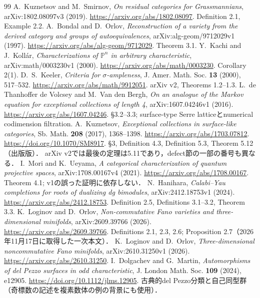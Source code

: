 \documentclass[11pt,a4paper]{ltjsarticle}
\begin{document}
\begingroup\small
\begin{thebibliography}{99}
 A.~Kuznetsov and M.~Smirnov,
\emph{On residual categories for Grassmannians}, arXiv:1802.08097v3 (2019).
\url{https://arxiv.org/abs/1802.08097}. Definition 2.1, Example 2.2.
 A.~Bondal and D.~Orlov,
\emph{Reconstruction of a variety from the derived category and groups of autoequivalences},
arXiv:alg-geom/9712029v1 (1997).
\url{https://arxiv.org/abs/alg-geom/9712029}. Theorem 3.1.
 Y.~Kachi and J.~Koll\'ar,
\emph{Characterizations of $\mathbb P^n$ in arbitrary characteristic},
arXiv:math/0003230v1 (2000).
\url{https://arxiv.org/abs/math/0003230}. Corollary 2(1).
 D.~S.~Keeler,
\emph{Criteria for $\sigma$-ampleness}, J. Amer. Math. Soc. \textbf{13} (2000), 517--532.
\url{https://arxiv.org/abs/math/9912051}. arXiv v2, Theorems 1.2--1.3.
 L.~de Thanhoffer de Volcsey and M.~Van den Bergh,
\emph{On an analogue of the Markov equation for exceptional collections of length 4},
arXiv:1607.04246v1 (2016). \url{https://arxiv.org/abs/1607.04246}.
\S3.2--3.3; surface-type Serre latticeとnumerical codimension filtration.
 A.~Kuznetsov,
\emph{Exceptional collections in surface-like categories},
Sb. Math. \textbf{208} (2017), 1368--1398.
\url{https://arxiv.org/abs/1703.07812}.
\url{https://doi.org/10.1070/SM8917}.
\S3, Definition 4.3, Definition 5.3, Theorem 5.12（出版版）．
arXiv v2では最後の定理は5.11であり，defect節の一部の番号も異なる．
 I.~Mori and K.~Ueyama,
\emph{A categorical characterization of quantum projective spaces},
arXiv:1708.00167v4 (2021). \url{https://arxiv.org/abs/1708.00167}.
Theorem 4.1; v1の誤った証明に依存しない．
 N.~Hanihara,
\emph{Calabi--Yau completions for roots of dualizing dg bimodules},
arXiv:2412.18753v1 (2024). \url{https://arxiv.org/abs/2412.18753}.
Definition 2.5, Definitions 3.1--3.2, Theorem 3.3.
 K.~Loginov and D.~Orlov,
\emph{Non-commutative Fano varieties and three-dimensional minifolds},
arXiv:2609.39766 (2026). \url{https://arxiv.org/abs/2609.39766}.
Definitions 2.1, 2.3, 2.6; Proposition 2.7（2026年11月17日に取得した一次本文）．
 K.~Loginov and D.~Orlov,
\emph{Three-dimensional noncommutative Fano minifolds},
arXiv:2610.31250v1 (2026). \url{https://arxiv.org/abs/2610.31250}.
 I.~Dolgachev and G.~Martin,
\emph{Automorphisms of del Pezzo surfaces in odd characteristic},
J. London Math. Soc. \textbf{109} (2024), e12905.
\url{https://doi.org/10.1112/jlms.12905}.
古典的del Pezzo分類と自己同型群（奇標数の記述を複素数体の例の背景にも使用）．

\end{thebibliography}
\end{document}
